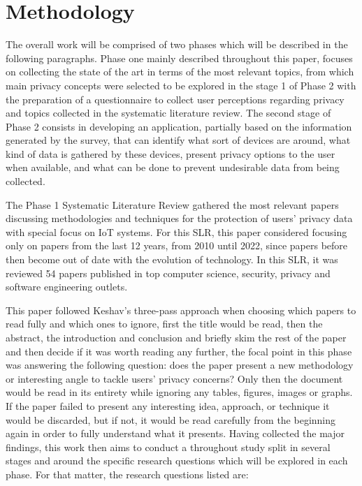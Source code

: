 %
%
\section{Methodology}

The overall work will be comprised of two phases which will be described
in the following paragraphs. Phase one mainly described throughout this
paper, focuses on collecting the state of the art in terms of the most relevant
topics, from which main privacy concepts were selected to be explored in
the stage 1 of Phase 2 with the preparation of a questionnaire to collect
user perceptions regarding privacy and topics collected in the systematic
literature review. The second stage of Phase 2 consists in developing an
application, partially based on the information generated by the survey,
that can identify what sort of devices are around, what kind of data is
gathered by these devices, present privacy options to the user when available,
and what can be done to prevent undesirable data from being collected.
\par
The Phase 1 Systematic Literature Review gathered the most relevant papers
discussing methodologies and techniques for the protection of users' privacy
data with special focus on IoT systems. For this SLR, this paper considered
focusing only on papers from the last 12 years, from 2010 until 2022, since
papers before then become out of date with the evolution of technology.
In this SLR, it was reviewed 54 papers published in top computer science,
security, privacy and software engineering outlets.

This paper followed Keshav's three-pass approach \cite{KeshavHow} when choosing
which papers to read fully and which ones to ignore, first the title would
be read, then the abstract, the introduction and conclusion and briefly
skim the rest of the paper and then decide if it was worth reading any further,
the focal point in this phase was answering the following question: does
the paper present a new methodology or interesting angle to tackle users'
privacy concerns? Only then the document would be read in its entirety while
ignoring any tables, figures, images or graphs. If the paper failed to present
any interesting idea, approach, or technique it would be discarded, but
if not, it would be read carefully from the beginning again in order to
fully understand what it presents. Having collected the major findings,
this work then aims to conduct a throughout study split in several stages
and around the specific research questions which will be explored in each
phase. For that matter, the research questions listed are:

